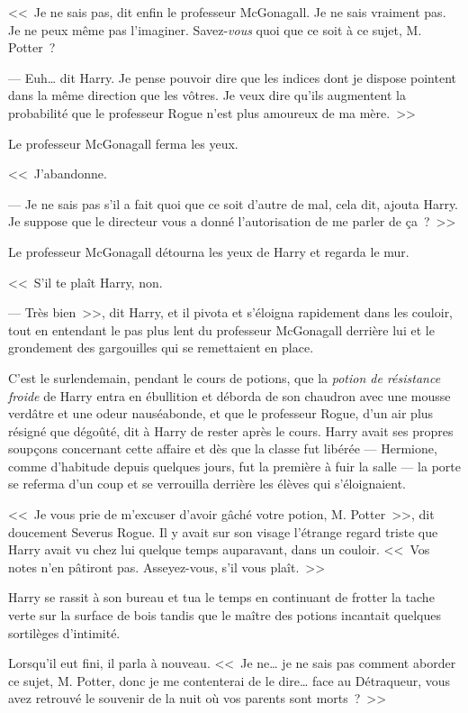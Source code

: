 \later

<<~Je ne sais pas, dit enfin le professeur McGonagall. Je ne sais vraiment pas. Je ne peux même pas l'imaginer. Savez-\emph{vous} quoi que ce soit à ce sujet, M. Potter~?

--- Euh… dit Harry. Je pense pouvoir dire que les indices dont je dispose pointent dans la même direction que les vôtres. Je veux dire qu'ils augmentent la probabilité que le professeur Rogue n'est plus amoureux de ma mère.~>>

Le professeur McGonagall ferma les yeux.

<<~J'abandonne.

--- Je ne sais pas s'il a fait quoi que ce soit d'autre de mal, cela dit, ajouta Harry. Je suppose que le directeur vous a donné l'autorisation de me parler de ça~?~>>

Le professeur McGonagall détourna les yeux de Harry et regarda le mur.

<<~S'il te plaît Harry, non.

--- Très bien~>>, dit Harry, et il pivota et s'éloigna rapidement dans les couloir, tout en entendant le pas plus lent du professeur McGonagall derrière lui et le grondement des gargouilles qui se remettaient en place.

\later

C'est le surlendemain, pendant le cours de potions, que la \emph{potion de résistance froide} de Harry entra en ébullition et déborda de son chaudron avec une mousse verdâtre et une odeur nauséabonde, et que le professeur Rogue, d'un air plus résigné que dégoûté, dit à Harry de rester après le cours. Harry avait ses propres soupçons concernant cette affaire et dès que la classe fut libérée — Hermione, comme d'habitude depuis quelques jours, fut la première à fuir la salle — la porte se referma d'un coup et se verrouilla derrière les élèves qui s'éloignaient.

<<~Je vous prie de m'excuser d'avoir gâché votre potion, M. Potter~>>, dit doucement Severus Rogue. Il y avait sur son visage l'étrange regard triste que Harry avait vu chez lui quelque temps auparavant, dans un couloir. <<~Vos notes n'en pâtiront pas. Asseyez-vous, s'il vous plaît.~>>

Harry se rassit à son bureau et tua le temps en continuant de frotter la tache verte sur la surface de bois tandis que le maître des potions incantait quelques sortilèges d'intimité.

Lorsqu'il eut fini, il parla à nouveau. <<~Je ne… je ne sais pas comment aborder ce sujet, M. Potter, donc je me contenterai de le dire… face au Détraqueur, vous avez retrouvé le souvenir de la nuit où vos parents sont morts~?~>>

